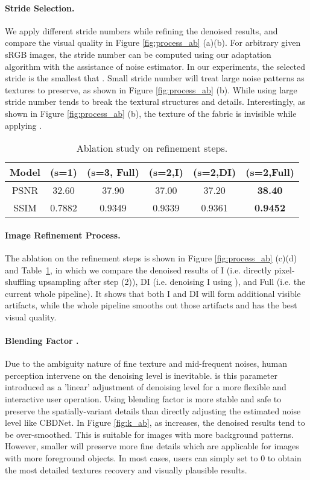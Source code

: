 \documentclass[letterpaper]{article} \usepackage{aaai20}  \usepackage{times}  \usepackage{helvet} \usepackage{courier}  \usepackage{comment}
\begin{document}
\paragraph{Stride Selection.}
We apply different stride numbers while refining the denoised results, and compare the visual quality in Figure \ref{fig:process_ab} (a)(b). For arbitrary given sRGB images, the stride number can be computed using our adaptation algorithm with the assistance of noise estimator. In our experiments, the selected stride is the smallest  that . Small stride number will treat large noise patterns as textures to preserve, as shown in Figure \ref{fig:process_ab} (b). While using large stride number tends to break the textural structures and details. Interestingly, as shown in Figure \ref{fig:process_ab} (b), the texture of the fabric is invisible while applying . 
\begin{table}[t]\setlength{\tabcolsep}{4pt}
\centering
\small
\caption{Ablation study on refinement steps.}
\begin{tabular}{|c|c|c|c|c|c|}
\hline
Model & (s=1) & (s=3, Full) & (s=2,I) & (s=2,DI) & (s=2,Full) \\ \hline 
PSNR&32.60&37.90&37.00&37.20&\bf38.40\\
SSIM&0.7882&0.9349&0.9339&0.9361&\bf0.9452\\
\hline
\end{tabular}
\label{exp:dndab}
\end{table}\paragraph{Image Refinement Process.}
The ablation on the refinement steps is shown in Figure \ref{fig:process_ab} (c)(d) and Table~\ref{exp:dndab}, in which we compare the denoised results of I (i.e. directly pixel-shuffling upsampling after step (2)), DI (i.e. denoising I using ), and Full (i.e. the current whole pipeline). It shows that both I and DI will form additional visible artifacts, while the whole pipeline smooths out those artifacts and has the best visual quality.  

\paragraph{Blending Factor .}
Due to the ambiguity nature of fine texture and mid-frequent noises, human perception intervene on the denoising level is inevitable.  is this parameter introduced as a 'linear' adjustment of denoising level for a more flexible and interactive user operation. Using blending factor  is more stable and safe to preserve the spatially-variant details than directly adjusting the estimated noise level like CBDNet. In Figure \ref{fig:k_ab}, as  increases, the denoised results tend to be over-smoothed. This is suitable for images with more background patterns. However, smaller  will preserve more fine details which are applicable for images with more foreground objects. 
In most cases, users can simply set  to 0 to obtain the most detailed textures recovery and visually plausible results.
\end{document}
